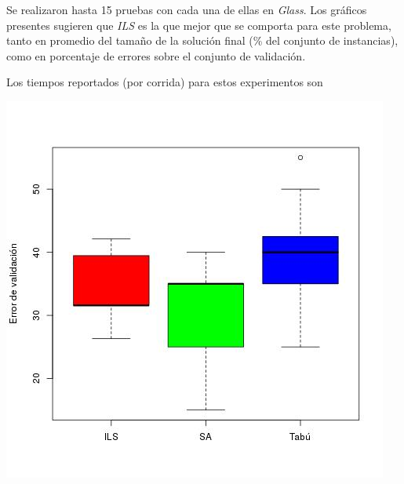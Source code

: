 \documentclass[11pt]{article}
\begin{document}
Se realizaron 
hasta 15 pruebas con cada una de ellas en \emph{Glass}. Los gráficos 
presentes sugieren que \emph{ILS} es la que mejor que se comporta para este problema, 
tanto en promedio del tamaño de la solución final (\% del conjunto de instancias), 
como en porcentaje de errores sobre el conjunto de validación.

Los tiempos reportados (por corrida) para estos experimentos son

\begin{table}[h]
\caption{Resultados para tamaño de solución}
\label{tabla:2}
\end{table}


\begin{center}
  \includegraphics[scale=0.4]{val_errors.jpeg}~\\[1cm]
\end{center}
\end{document}
